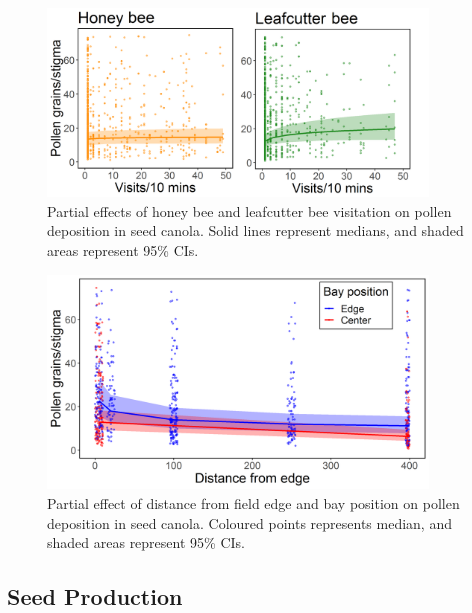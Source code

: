 \documentclass[12pt]{article} %
\begin{document}
\begin{figure}
    \centering
    \includegraphics[width=0.9\textwidth,keepaspectratio=true]{slopeVisPol_both.png}
    \caption[Partial effects of honey bee and leafcutter bee visitation on pollen deposition in seed canola]{Partial effects of honey bee and leafcutter bee visitation on pollen deposition in seed canola. Solid lines represent medians, and shaded areas represent 95\% CIs.}
    \label{fig:visPol_both}
\end{figure}

\begin{figure} 
    \centering
    \includegraphics[width=0.9\textwidth,keepaspectratio=true]{slopeDistCentPol.png}
    \caption[Partial effect of distance from field edge and bay position on pollen deposition in seed canola]{Partial effect of distance from field edge and bay position on pollen deposition in seed canola. Coloured points represents median, and shaded areas represent 95\% CIs.}
    \label{fig:distCentPol}
\end{figure}

\subsection{Seed Production}
\end{document}
